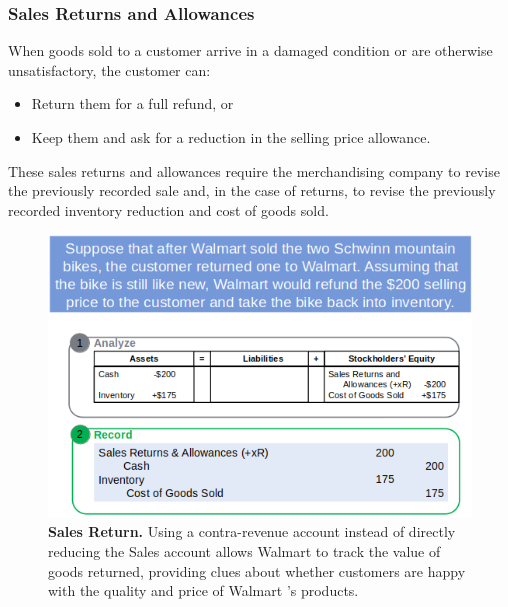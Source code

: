 \documentclass[../main.tex]{subfiles}
\begin{document}
	\subsubsection{Sales Returns and Allowances}
	
	When goods sold to a customer arrive in a damaged condition or are 
	otherwise unsatisfactory, the customer can:
	\begin{itemize}[noitemsep]
		\item Return them for a full refund, or 
		\item Keep them and ask for a reduction in the selling price \ie 
		allowance.
	\end{itemize}
	
	These sales returns and allowances require the merchandising company to 
	revise the previously recorded sale and, in the case of returns, to revise 
	the previously recorded inventory reduction and cost of goods sold.
	
	\begin{figure}[ht!]
		\centering
		\includegraphics[width=1\columnwidth]{images/c7/sales_return_and_allowance_eg.png}
		\caption{\textbf{Sales Return.} Using a contra-revenue account instead 
		of directly reducing 
		the Sales account allows Walmart to track the value of goods returned, 
		providing clues about whether customers are happy with the quality and 
		price of Walmart ’s products.}	
	\end{figure}
\end{document}
